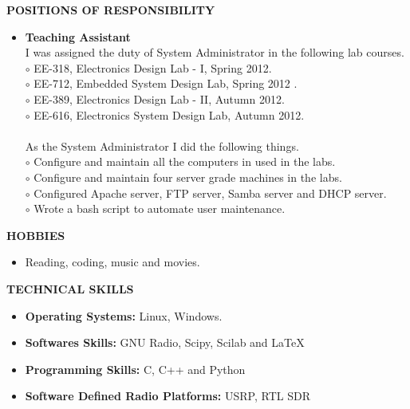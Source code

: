 \documentclass[a4paper,10pt]{article}
\begin{document}
 \colorbox{titleColor}{\parbox{6.5in}{\textbf{POSITIONS OF RESPONSIBILITY}}}

 \begin{itemize}
 \setlength{\itemsep}{1pt}
 \item \textbf{Teaching Assistant} \\
I was assigned the duty of System Administrator in the following lab courses.\\
$\circ$ EE-318, Electronics Design Lab - I, Spring 2012. \\
$\circ$ EE-712, Embedded System Design Lab, Spring 2012 . \\ 
$\circ$ EE-389, Electronics Design Lab - II, Autumn 2012.  \\
$\circ$ EE-616, Electronics System Design Lab, Autumn 2012. \\
\qquad \\
As the System Administrator I did the following things. \\
$\circ$ Configure and maintain all the computers in used in the labs. \\
$\circ$ Configure and maintain four server grade machines in the labs. \\
$\circ$ Configured Apache server, FTP server, Samba server and DHCP server. \\
$\circ$ Wrote a bash script to automate user maintenance.
 \end{itemize}

\colorbox{titleColor}{\parbox{6.5in}{\textbf{HOBBIES}}}

  \begin{itemize}
 \setlength{\itemsep}{1pt}
    \item Reading, coding, music and movies.
  \end{itemize}
  
 \colorbox{titleColor}{\parbox{6.5in}{\textbf{TECHNICAL SKILLS}}}
 
 \begin{itemize}
 \setlength{\itemsep}{1pt}
 \item \textbf{{Operating Systems:}} Linux, Windows.
 \item \textbf{{Softwares Skills:}} GNU Radio, Scipy, Scilab and \LaTeX
 \item \textbf{{Programming Skills:}} C, C++ and Python
 \item \textbf{{Software Defined Radio Platforms:}} USRP, RTL SDR
 \end{itemize}
\end{document}
